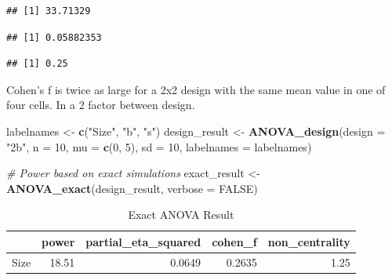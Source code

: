 \documentclass[]{book}
\newenvironment{Shaded}{\begin{snugshade}}{\end{snugshade}}
\newcommand{\CommentTok}[1]{\textcolor[rgb]{0.56,0.35,0.01}{\textit{#1}}}
\newcommand{\DataTypeTok}[1]{\textcolor[rgb]{0.13,0.29,0.53}{#1}}
\newcommand{\DecValTok}[1]{\textcolor[rgb]{0.00,0.00,0.81}{#1}}
\newcommand{\KeywordTok}[1]{\textcolor[rgb]{0.13,0.29,0.53}{\textbf{#1}}}
\newcommand{\NormalTok}[1]{#1}
\newcommand{\OperatorTok}[1]{\textcolor[rgb]{0.81,0.36,0.00}{\textbf{#1}}}
\newcommand{\OtherTok}[1]{\textcolor[rgb]{0.56,0.35,0.01}{#1}}
\newcommand{\StringTok}[1]{\textcolor[rgb]{0.31,0.60,0.02}{#1}}
\begin{document}
\begin{verbatim}
## [1] 33.71329
\end{verbatim}

\begin{Shaded}
\end{Shaded}

\begin{verbatim}
## [1] 0.05882353
\end{verbatim}

\begin{Shaded}
\end{Shaded}

\begin{verbatim}
## [1] 0.25
\end{verbatim}

Cohen's f is twice as large for a 2x2 design with the same mean value in one of four cells. In a 2 factor between design.

\begin{Shaded}
\begin{Highlighting}[]
\NormalTok{labelnames <-}\StringTok{ }\KeywordTok{c}\NormalTok{(}\StringTok{"Size"}\NormalTok{, }\StringTok{"b"}\NormalTok{, }\StringTok{"s"}\NormalTok{)}
\NormalTok{design_result <-}\StringTok{ }\KeywordTok{ANOVA_design}\NormalTok{(}\DataTypeTok{design =} \StringTok{"2b"}\NormalTok{, }
                              \DataTypeTok{n =} \DecValTok{10}\NormalTok{,  }
                              \DataTypeTok{mu =} \KeywordTok{c}\NormalTok{(}\DecValTok{0}\NormalTok{, }\DecValTok{5}\NormalTok{), }
                              \DataTypeTok{sd =} \DecValTok{10}\NormalTok{, }
                              \DataTypeTok{labelnames =}\NormalTok{ labelnames) }

\CommentTok{# Power based on exact simulations}
\NormalTok{exact_result <-}\StringTok{ }\KeywordTok{ANOVA_exact}\NormalTok{(design_result,}
                            \DataTypeTok{verbose =} \OtherTok{FALSE}\NormalTok{)}
\end{Highlighting}
\end{Shaded}

\begin{table}[t]

\caption{\label{tab:unnamed-chunk-156}Exact ANOVA Result}
\centering
\begin{tabular}{l|r|r|r|r}
\hline
  & power & partial\_eta\_squared & cohen\_f & non\_centrality\\
\hline
Size & 18.51 & 0.0649 & 0.2635 & 1.25\\
\hline
\end{tabular}
\end{table}
\end{document}
